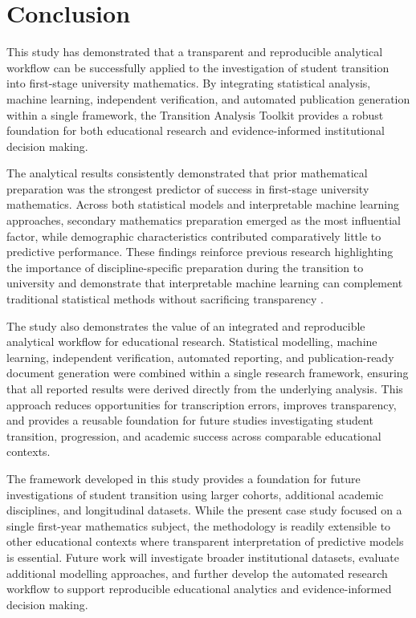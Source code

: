 %

\section{Conclusion}
\label{sec:conclusion}

This study has demonstrated that a transparent and reproducible analytical workflow can be successfully applied to the investigation of student transition into 
first-stage university mathematics. By integrating statistical analysis, machine learning, independent verification, and automated publication generation within a 
single framework, the Transition Analysis Toolkit provides a robust foundation for both educational research and evidence-informed institutional decision making.

The analytical results consistently demonstrated that prior mathematical preparation was the strongest predictor of success in first-stage university mathematics. 
Across both statistical models and interpretable machine learning approaches, secondary mathematics preparation emerged as the most influential factor, while demographic 
characteristics contributed comparatively little to predictive performance. These findings reinforce previous research highlighting the importance of discipline-specific 
preparation during the transition to university and demonstrate that interpretable machine learning can complement traditional statistical methods without sacrificing 
transparency \cite{Hourigan2007underpreparedness,Wood2001,England2021transition}.

The study also demonstrates the value of an integrated and reproducible analytical workflow for educational research. 
Statistical modelling, machine learning, independent verification, automated reporting, and publication-ready document generation were combined 
within a single research framework, ensuring that all reported results were derived directly from the underlying analysis. 
This approach reduces opportunities for transcription errors, improves transparency, and provides a reusable foundation for future studies 
investigating student transition, progression, and academic success across comparable educational contexts.

The framework developed in this study provides a foundation for future investigations of student transition using larger cohorts, additional academic disciplines, 
and longitudinal datasets. While the present case study focused on a single first-year mathematics subject, the methodology is readily extensible to other educational 
contexts where transparent interpretation of predictive models is essential. Future work will investigate broader institutional datasets, evaluate additional modelling 
approaches, and further develop the automated research workflow to support reproducible educational analytics and evidence-informed decision making.

